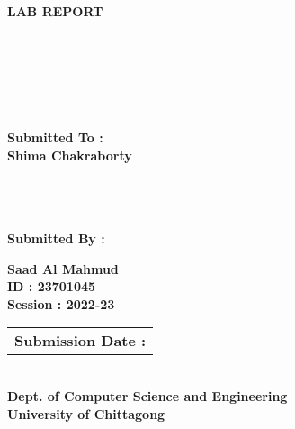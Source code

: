 \documentclass{article}
\begin{document}
\centering
\doublespacing
\begin{spacing}{1}
\textbf{\Huge{LAB REPORT}} \\ \vspace{1.5cm}
\end{spacing}


\begingroup
\centering
{} \\
 \\
\raggedright
{} \\
 \\ \vspace{1.5cm}
\endgroup


\begin{sub}
\centering
\textbf{Submitted To :} \\
\textbf{\Large{Shima Chakraborty}} \\
 \\
 \\
 \\ \vspace{1cm}
\end{sub}


\begingroup
\centering
\textbf{Submitted By :} \\
\endgroup

\begin{name}
\centering
\doublespacing
\textbf{\large{ Saad Al Mahmud }} \\ \vspace{0.5cm}
\textbf{\large{ID : 23701045}} \\ \vspace{0.5cm}
\textbf{\large{Session : 2022-23}} \\ \vspace{1cm}
\end{name}

\begin{tabular}{|c|}
\hline
\textbf{\Large{Submission Date : }} \hspace{6cm} \vspace{1.2cm}
\end{tabular}



\begingroup
\centering
{} \\
\textbf{\Large{Dept. of Computer Science and Engineering}} \\
\textbf{\LARGE{University of Chittagong}} \\
\endgroup
\end{document}
